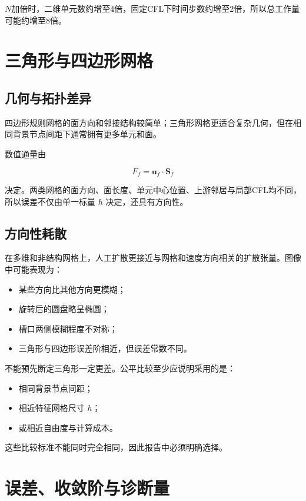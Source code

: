 \documentclass[UTF8,12pt,a4paper,fontset=fandol]{ctexart}
\numberwithin{equation}{section}
\newcommand{\Sf}{\bm S}
\begin{document}
$N$加倍时，二维单元数约增至4倍，固定CFL下时间步数约增至2倍，所以总工作量可能约增至8倍。

\section{三角形与四边形网格}

\subsection{几何与拓扑差异}

四边形规则网格的面方向和邻接结构较简单；三角形网格更适合复杂几何，但在相同背景节点间距下通常拥有更多单元和面。

数值通量由

\begin{equation}
  F_f=\bm u_f\cdot\Sf_f
\end{equation}

决定。两类网格的面方向、面长度、单元中心位置、上游邻居与局部CFL均不同，所以误差不仅由单一标量 $h$ 决定，还具有方向性。

\subsection{方向性耗散}

在多维和非结构网格上，人工扩散更接近与网格和速度方向相关的扩散张量。图像中可能表现为：

\begin{itemize}
  \item 某些方向比其他方向更模糊；
  \item 旋转后的圆盘略呈椭圆；
  \item 槽口两侧模糊程度不对称；
  \item 三角形与四边形误差阶相近，但误差常数不同。
\end{itemize}

不能预先断定三角形一定更差。公平比较至少应说明采用的是：

\begin{itemize}
  \item 相同背景节点间距；
  \item 相近特征网格尺寸 $h$；
  \item 或相近自由度与计算成本。
\end{itemize}

这些比较标准不能同时完全相同，因此报告中必须明确选择。

\section{误差、收敛阶与诊断量}
\end{document}
